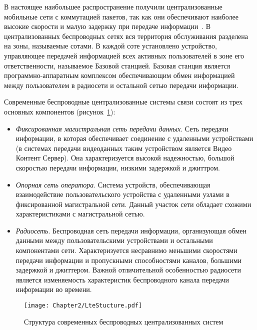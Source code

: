 В настоящее наибольшее распространение получили централизованные мобильные сети с коммутацией пакетов, так как они обеспечивают наиболее высокие скорости и малую задержку при передаче информации~\cite{Cisco}. В централизованных беспроводных сетях вся территория обслуживания разделена на зоны, называемые сотами. В каждой соте установлено устройство, управляющее передачей информацией всех активных пользователей в зоне его ответственности, называемое Базовой станцией. Базовая станция является программно-аппаратным комплексом обеспечивающим обмен информацией между пользователем в радиосети и остальной сетью передачи информации.

Современные беспроводные централизованные системы связи состоят из трех основных компонентов (рисунок~\ref{fig:LteStructure}):
\begin{itemize}
  \item \textit{Фиксированная магистральная сеть передачи данных}. Сеть передачи информации, в которая обеспечивает соединение с удаленными устройствами (в системах передачи видеоданных таким устройством является Видео Контент Сервер). Она характеризуется высокой надежностью, большой скоростью передачи информации, низкими задержкой и джиттром.
  \item \textit{Опорная сеть оператора}. Система устройств, обеспечивающая взаимодействие пользовательского устройства с удаленными узлами в фиксированной магистральной сети. Данный участок сети обладает схожими характеристиками с магистральной сетью.
  \item \textit{Радиосеть}. Беспроводная сеть передачи информации, организующая обмен данными между пользовательскими устройствами и остальными компонентами сети. Характеризуется несравнимо меньшими скоростями передачи информации и пропускными способностями каналов, большими задержкой и джиттером. Важной отличительной особенностью радиосети является изменяемость характеристик беспроводного канала передачи информации во времени.
\end{itemize}

\begin{figure}[htbp]
\begin{center}
\texttt{[image: Chapter2/LteStucture.pdf]}
\caption{Структура современных беспроводных централизованных систем}
\label{fig:LteStructure}
\end{center}
\end{figure}

